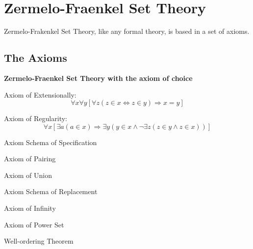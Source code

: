 \section{Zermelo-Fraenkel Set Theory}

Zermelo-Frakenkel Set Theory, like any formal theory, is based in a set of axioms.

\subsection{The Axioms}
\begin{axiomset}
    \begin{center}
        \textbf{Zermelo-Fraenkel Set Theory with the axiom of choice}
    \end{center}
    \begin{axiom}
        Axiom of Extensionally:
        \begin{equation}
          \forall x \forall y [ \forall z ( z \in x \Leftrightarrow z \in y) \Rightarrow x = y ]
        \end{equation}
    \end{axiom}
    \begin{axiom}
        Axiom of Regularity:
        \begin{equation}
          \forall x [ \exists a ( a \in x ) \Rightarrow \exists y ( y \in x \land \neg \exists z ( z \in y \land z \in x ))]
        \end{equation}
    \end{axiom}
    \begin{axiom}
        Axiom Schema of Specification
    \end{axiom}
    \begin{axiom}
        Axiom of Pairing
    \end{axiom}
    \begin{axiom}
        Axiom of Union
    \end{axiom}
    \begin{axiom}
        Axiom Schema of Replacement
    \end{axiom}
    \begin{axiom}
        Axiom of Infinity
    \end{axiom}
    \begin{axiom}
        Axiom of Power Set
    \end{axiom}
    \begin{axiom}
        Well-ordering Theorem
    \end{axiom}
\end{axiomset}

